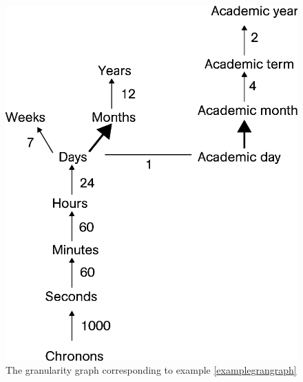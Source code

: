 

\begin{figure}
\centering
\includegraphics[scale=0.5]{graphs/granularityGraph.eps}
\caption{The granularity graph corresponding to example \ref{examplegrangraph}}
\label{fig:granularity-graph-example}
\end{figure}

\vspace{-25pt}

